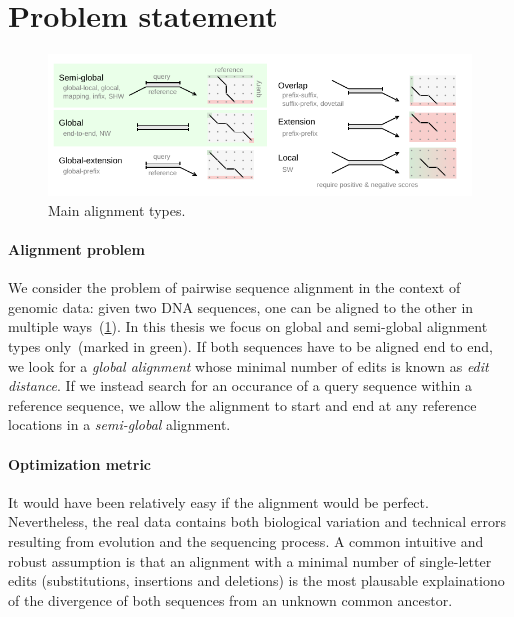 \section*{Problem statement}

\begin{figure}[t]  %
    \includegraphics[width=\textwidth]{alignment-types-thesis.pdf}
	\caption[Main alignment types]{Main alignment types.}
    \label{fig:alignment-types}
\end{figure}

\paragraph{Alignment problem}
We consider the problem of pairwise sequence alignment in the context of genomic
data: given two DNA sequences, one can be aligned to the other in multiple
ways~(\cref{fig:alignment-types}). In this thesis we focus on global and
semi-global alignment types only~(marked in green). If both sequences have to be
aligned end to end, we look for a \emph{global alignment} whose minimal number
of edits is known as \emph{edit distance}. If we instead search for an occurance
of a query sequence within a reference sequence, we allow the alignment to start
and end at any reference locations in a \emph{semi-global} alignment.

\paragraph{Optimization metric}
It would have been relatively easy if the alignment would be perfect.
Nevertheless, the real data contains both biological variation and technical
errors resulting from evolution and the sequencing process. A common intuitive
and robust assumption is that an alignment with a minimal number of
single-letter edits (substitutions, insertions and deletions) is the most
plausable explainationo of the divergence of both sequences from an unknown
common ancestor.

